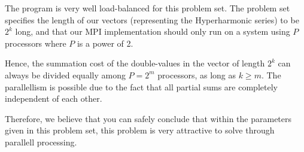 \documentclass[fontsize=11pt,paper=a4,titlepage]{report}
\begin{document}
The program is very well load-balanced for this problem set. The problem set
specifies the length of our vectors (representing the Hyperharmonic series) to
be $2^k$ long, and that our MPI implementation should only run on a system using
$P$ processors where $P$ is a power of 2.

Hence, the summation cost of the double-values in the vector of length $2^k$ can
always be divided equally among $P = 2^m$ processors, as long as $k\geq m$. The
parallellism is possible due to the fact that all partial sums are completely
independent of each other. \newline


Therefore, we believe that you can safely conclude that within the parameters
given in this problem set, this problem is very attractive to solve through
parallell processing.



% 
% 
% 
% 

\end{document}
